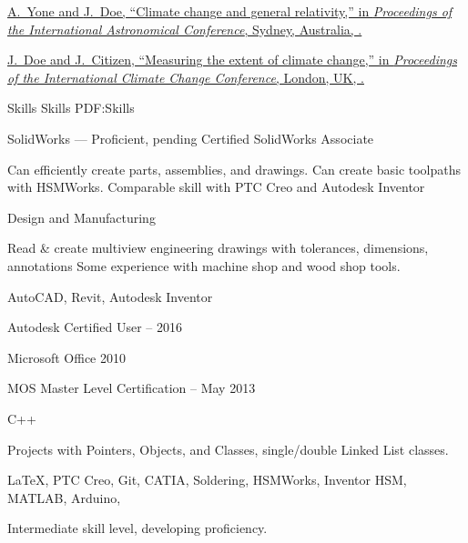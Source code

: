 \documentclass[letterpaper,MMMyyyy,nonstopmode]{simpleresumecv}
\begin{document}
\begin{Body}
	\Gap
	\NumberedItem{[100]}
	\href{http://www.example.com/my-paper-doi-2}
	{A.~Yone and \underline{J.~Doe},
	``Climate change and general relativity,''
	in \textit{Proceedings of the International Astronomical Conference},
	Sydney, Australia,
	.}
	
	\Gap
	\NumberedItem{[10]}
	\href{http://www.example.com/my-paper-doi-1}
	{\underline{J.~Doe} and J.~Citizen,
	``Measuring the extent of climate change,''
	in \textit{Proceedings of the International Climate Change Conference},
	London, UK,
	.}
	
	\endgroup
\fi


\Section
{Skills}
{Skills}
{PDF:Skills}

\BulletItem
SolidWorks --- Proficient, pending Certified SolidWorks Associate
\begin{Detail}
\SubBulletItem
Can efficiently create parts, assemblies, and drawings. Can create basic toolpaths with HSMWorks. Comparable skill with PTC Creo and Autodesk Inventor
\end{Detail}
\BulletItem
Design and Manufacturing
\begin{Detail}
\SubBulletItem
Read \& create multiview engineering drawings with tolerances, dimensions, annotations
\SubBulletItem
Some experience with machine shop and wood shop tools.
\end{Detail}

\BulletItem
AutoCAD, Revit, Autodesk Inventor
\begin{Detail}
\SubBulletItem
Autodesk Certified User -- 2016
\end{Detail}
\BulletItem
Microsoft Office 2010
\begin{Detail}
\SubBulletItem
MOS Master Level Certification -- May 2013
\end{Detail}
\BulletItem
C++
\begin{Detail}
\SubBulletItem
Projects with Pointers, Objects, and Classes, single/double Linked List classes. 
\end{Detail}
\BulletItem
{\LaTeX}, %
PTC Creo, Git, CATIA, Soldering, HSMWorks, Inventor HSM, MATLAB,
Arduino, %
\begin{Detail}
\SubBulletItem
Intermediate skill level, developing proficiency.
\end{Detail}


\end{Body}
\end{document}
